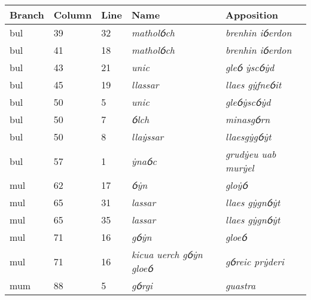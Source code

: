 \begin{table}[]
\centering
\begin{tabular}{@{}lllll@{}}
\toprule
\textbf{Branch} & \textbf{Column} & \textbf{Line} & \textbf{Name}                   & \textbf{Apposition}         \\ \midrule
\acrshort{bul}             & 39              & 32            & \textit{matholỽch}              & \textit{brenhin iỽerdon}    \\
\acrshort{bul}             & 41              & 18            & \textit{matholỽch}              & \textit{brenhin iỽerdon}    \\
\acrshort{bul}             & 43              & 21            & \textit{unic}                   & \textit{gleỽ ẏscỽẏd}        \\
\acrshort{bul}             & 45              & 19            & \textit{llassar}                & \textit{llaes gẏfneỽit}     \\
\acrshort{bul}             & 50              & 5             & \textit{unic}                   & \textit{gleỽẏscỽẏd}         \\
\acrshort{bul}             & 50              & 7             & \textit{ỽlch}                   & \textit{minasgỽrn}          \\
\acrshort{bul}             & 50              & 8             & \textit{llaẏssar}               & \textit{llaesgẏgỽẏt}        \\
\acrshort{bul}             & 57              & 1             & \textit{ẏnaỽc}                  & \textit{grudẏeu uab murẏel} \\
\acrshort{mul}             & 62              & 17            & \textit{ỽẏn}                    & \textit{gloẏỽ}              \\
\acrshort{mul}             & 65              & 31            & \textit{lassar}                 & \textit{llaes gẏgnỽẏt}      \\
\acrshort{mul}             & 65              & 35            & \textit{lassar}                 & \textit{llaes gẏgnỽẏt}      \\
\acrshort{mul}             & 71              & 16            & \textit{gỽẏn}                   & \textit{gloeỽ}              \\
\acrshort{mul}             & 71              & 16            & \textit{kicua uerch gỽẏn gloeỽ} & \textit{gỽreic prẏderi}     \\
\acrshort{mum}             & 88              & 5             & \textit{gỽrgi}                  & \textit{guastra}            \\

\end{tabular}
\end{table}
